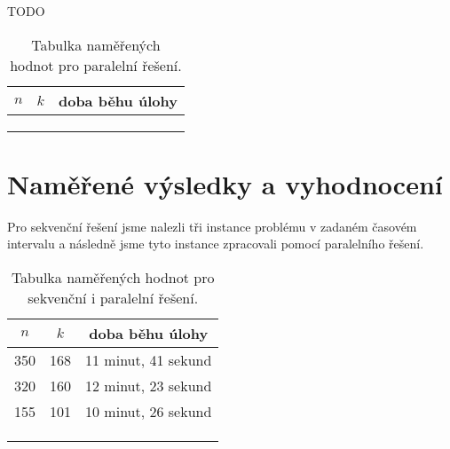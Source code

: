 \documentclass[12pt]{article}
\begin{document}
TODO



\begin{table}[ht]
  \begin{center}
    \begin{tabular}{| c | c | c |}
      \hline
      $n$ & $k$ & doba běhu úlohy \\ \hline
      & & \\ \hline
      & & \\ \hline
      & & \\
      \hline
    \end{tabular}
    \caption{Tabulka naměřených hodnot pro paralelní řešení.}
  \end{center}
\end{table}


\section{Naměřené výsledky a vyhodnocení}


Pro sekvenční řešení jsme nalezli tři instance problému v zadaném časovém intervalu a 
následně jsme tyto instance zpracovali pomocí paralelního řešení.

\begin{table}[ht]
  \begin{center}
    \begin{tabular}{| c | c | c |}
      \hline
      $n$ & $k$ & doba běhu úlohy \\ \hline
      350 & 168 & 11 minut, 41 sekund \\ \hline
      320 & 160 & 12 minut, 23 sekund \\ \hline
      155 & 101 & 10 minut, 26 sekund \\ \hline
      & & \\ \hline
      & & \\ \hline
      & & \\
      \hline
    \end{tabular}
    \caption{Tabulka naměřených hodnot pro sekvenční i paralelní řešení.}
  \end{center}
\end{table}
\end{document}
